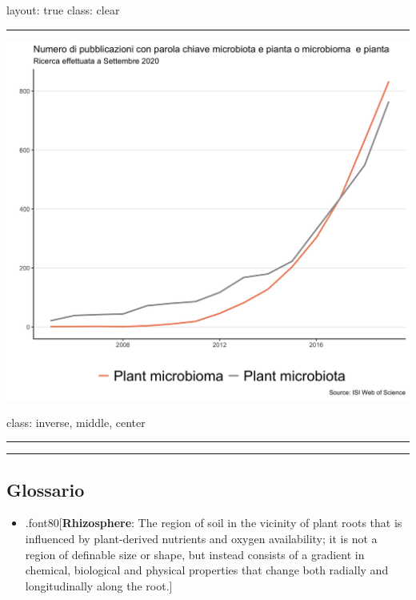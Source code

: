 \documentclass[
]{article}
\providecommand{\tightlist}{%
  \setlength{\itemsep}{0pt}\setlength{\parskip}{0pt}}
\begin{document}
layout: true class: clear

\begin{center}\rule{0.5\linewidth}{0.5pt}\end{center}

\begin{center}\includegraphics[width=630px]{images/PlantmicroPublications} \end{center}

class: inverse, middle, center

\begin{center}\rule{0.5\linewidth}{0.5pt}\end{center}

\begin{center}\rule{0.5\linewidth}{0.5pt}\end{center}

\hypertarget{glossario}{%
\subsection{Glossario}\label{glossario}}

\begin{itemize}
\tightlist
\item
  .font80{[}\textbf{Rhizosphere}: The region of soil in the vicinity of
  plant roots that is influenced by plant-derived nutrients and oxygen
  availability; it is not a region of definable size or shape, but
  instead consists of a gradient in chemical, biological and physical
  properties that change both radially and longitudinally along the
  root.{]}
\end{itemize}
\end{document}
